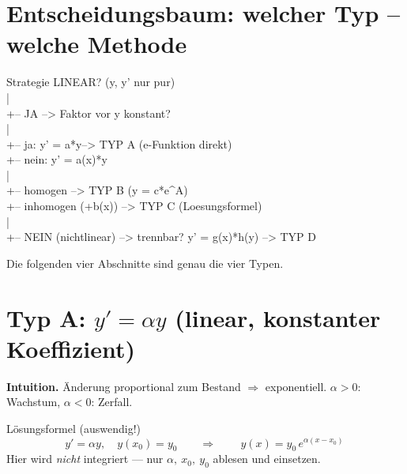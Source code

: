 \documentclass[a4paper,11pt]{article}
\begin{document}
\section{Entscheidungsbaum: welcher Typ -- welche Methode}

\begin{bspbox}{Strategie}
\ttfamily\small
LINEAR? (y, y' nur pur)\\
|\\
+-- JA --> Faktor vor y konstant?\\
\hspace*{2.2em}|\\
\hspace*{2.2em}+-- ja:  y' = a*y\hspace{2.6em}--> TYP A  (e-Funktion direkt)\\
\hspace*{2.2em}+-- nein: y' = a(x)*y\\
\hspace*{2.2em}\hspace*{4.5em}|\\
\hspace*{2.2em}\hspace*{4.5em}+-- homogen          --> TYP B  (y = c*e\^{}A)\\
\hspace*{2.2em}\hspace*{4.5em}+-- inhomogen (+b(x)) --> TYP C  (Loesungsformel)\\
|\\
+-- NEIN (nichtlinear) --> trennbar?  y' = g(x)*h(y)  --> TYP D
\end{bspbox}

Die folgenden vier Abschnitte sind genau die vier Typen.

\section{Typ A: $y'=\alpha y$ (linear, konstanter Koeffizient)}

\textbf{Intuition.} Änderung proportional zum Bestand $\Rightarrow$ exponentiell.
$\alpha>0$: Wachstum, $\alpha<0$: Zerfall.

\begin{satzbox}{Lösungsformel (auswendig!)}
\[
  y'=\alpha y,\quad y(x_0)=y_0 \qquad\Longrightarrow\qquad
  \boxed{\,y(x)=y_0\,e^{\alpha (x-x_0)}\,}
\]
Hier wird \emph{nicht} integriert — nur $\alpha,\ x_0,\ y_0$ ablesen und einsetzen.
\end{satzbox}
\end{document}

